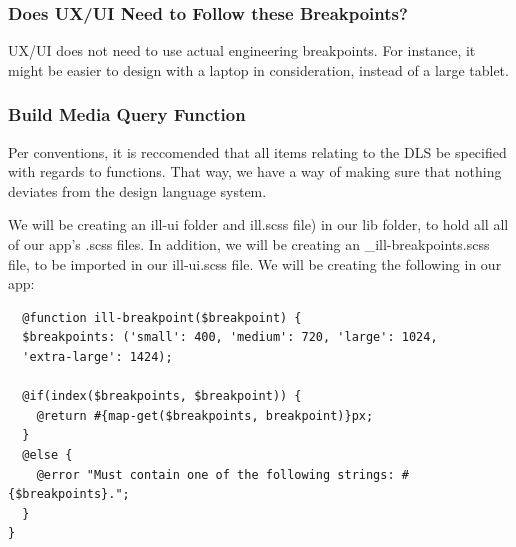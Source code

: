 \subsubsection{ Does UX/UI Need to Follow these Breakpoints? }
UX/UI does not need to use actual engineering breakpoints. For instance,
it might be easier to design with a laptop in consideration, instead of a large
tablet.

\subsubsection{ Build Media Query Function }
Per conventions, it is reccomended that all items relating to the DLS be
specified with regards to functions. That way, we have a way of making sure
that nothing deviates from the design language system.

We will be creating an ill-ui folder and ill.scss file) in our lib folder, to
hold all all of our app's .scss files. In addition, we will be creating an
 \_ill-breakpoints.scss file, to be imported in our ill-ui.scss file. We will be
creating the following in our app:

\begin{verbatim}
  @function ill-breakpoint($breakpoint) {
  $breakpoints: ('small': 400, 'medium': 720, 'large': 1024,
  'extra-large': 1424);

  @if(index($breakpoints, $breakpoint)) {
    @return #{map-get($breakpoints, breakpoint)}px;
  }
  @else {
    @error "Must contain one of the following strings: #{$breakpoints}.";
  }
}
\end{verbatim}

